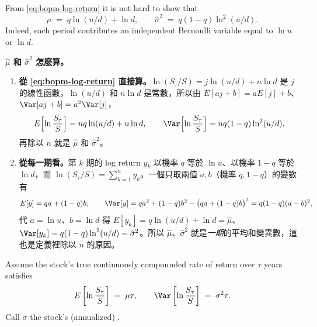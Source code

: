 From \eqref{eq:bopm-log-return} it is not hard to show that
\[
	\hat{\mu} \;=\; q\ln(u/d)+\ln d ,
	\qquad
	\hat{\sigma}^{2} \;=\; q(1-q)\ln^{2}(u/d) .
\]
\suppstart
Indeed, each period contributes an independent Bernoulli variable equal to $\ln u$ or $\ln d$.
\suppend

\suppstart
\begin{remark}
	\textbf{$\hat{\mu}$ 和 $\hat{\sigma}^{2}$ 怎麼算。}
	\begin{enumerate}[(1),nosep]
		\item \textbf{從 \eqref{eq:bopm-log-return} 直接算。}$\ln(S_{\tau}/S)=j\ln(u/d)+n\ln d$ 是 $j$ 的線性函數，$\ln(u/d)$ 和 $n\ln d$ 是常數，所以由 $E[aj+b]=aE[j]+b$、$\Var[aj+b]=a^{2}\Var[j]$，
		\[
			E\Bigl[\ln\frac{S_{\tau}}{S}\Bigr]=nq\ln(u/d)+n\ln d ,
			\qquad
			\Var\Bigl[\ln\frac{S_{\tau}}{S}\Bigr]=nq(1-q)\ln^{2}(u/d) ,
		\]
		再除以 $n$ 就是 $\hat{\mu}$ 和 $\hat{\sigma}^{2}$。
		\item \textbf{從每一期看。}第 $k$ 期的 log return $y_{k}$ 以機率 $q$ 等於 $\ln u$、以機率 $1-q$ 等於 $\ln d$，而 $\ln(S_{\tau}/S)=\sum_{k=1}^{n}y_{k}$。一個只取兩值 $a,b$（機率 $q,1-q$）的變數有
		\[
			E[y]=qa+(1-q)b ,
			\qquad
			\Var[y]=qa^{2}+(1-q)b^{2}-\bigl(qa+(1-q)b\bigr)^{2}=q(1-q)(a-b)^{2} ,
		\]
		代 $a=\ln u$、$b=\ln d$ 得 $E[y_{k}]=q\ln(u/d)+\ln d=\hat{\mu}$、$\Var[y_{k}]=q(1-q)\ln^{2}(u/d)=\hat{\sigma}^{2}$。所以 $\hat{\mu}$、$\hat{\sigma}^{2}$ 就是\emph{一期}的平均和變異數，這也是定義裡除以 $n$ 的原因。
	\end{enumerate}
\end{remark}
\suppend

Assume the stock's true continuously compounded rate of return over $\tau$ years satisfies
\[
	E\left[\ln\frac{S_{\tau}}{S}\right] \;=\; \mu\tau ,
	\qquad
	\Var\left[\ln\frac{S_{\tau}}{S}\right] \;=\; \sigma^{2}\tau .
\]
Call $\sigma$ the stock's (annualized) .

